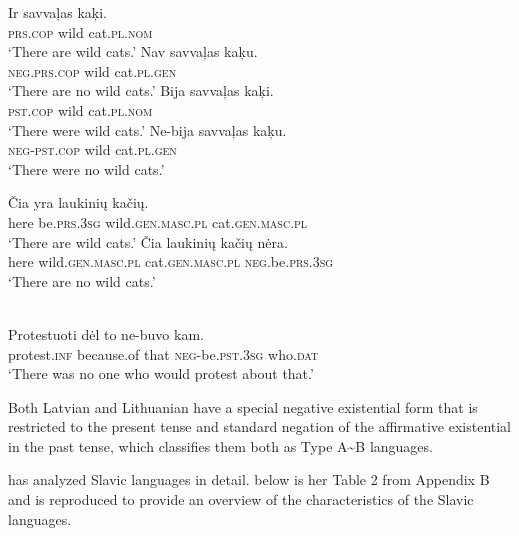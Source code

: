 ﻿\documentclass[output=paper]{langsci/langscibook}
\begin{document}
\begin{exe}\ex
{}
\begin{xlist}
\ex
\gll Ir savvaļas  kaķi. \\
\textsc{prs.cop} wild cat.\textsc{pl.nom} \\
    \glt `There are wild cats.'
\ex\label{ex:ieur-latvian-nowildcatsnow}
\gll Nav savvaļas kaķu.\\
\textsc{neg.prs.cop} wild cat.\textsc{pl.gen}\\
    \glt `There are no wild cats.'
\ex
\gll Bija      savvaļas kaķi.\\
\textsc{pst.cop} wild cat.\textsc{pl.nom}\\
    \glt `There were wild cats.'
\ex\label{ex:ieur-latvian-nowildcatspast}
\gll   Ne-bija savvaļas kaķu.\\
\textsc{neg}-\textsc{pst}.\textsc{cop} wild cat.\textsc{pl}.\textsc{gen}\\
    \glt `There were no wild cats.'
\end{xlist}
\ex{}
\begin{xlist}
\ex\gll Čia yra laukinių kačių. \\
here be.\textsc{prs.3sg} wild.\textsc{gen.masc.pl} cat.\textsc{gen.masc.pl}
\\
    \glt `There are wild cats.'
\ex\label{ex:ieur-lithuanian-nowildcatsnow}
\gll Čia  laukinių kačių nėra.\\
here wild.\textsc{gen.masc.pl} cat.\textsc{gen.masc.pl}
\textsc{neg}.be.\textsc{prs.3sg}\\
    \glt `There are no wild cats.'
\end{xlist}
\ex\label{ex:ieur-lithuanian-noprotest}
\\
    \gll Protestuoti dėl to ne-buvo kam.  \\
protest.\textsc{inf} because.of that
\textsc{neg}-be.\textsc{pst.3sg} who.\textsc{dat}\\
    \glt `There was no one who would protest about that.' 
\end{exe}
%
Both Latvian and Lithuanian have a special negative existential form that is restricted to the present tense and standard negation of the affirmative existential in the past tense, which classifies them both as Type A{\textasciitilde}B languages. 

\citet{Veselinova2014} has analyzed Slavic languages in detail.
 below is her Table 2 from Appendix B and is reproduced to
provide an overview of the characteristics of the Slavic languages.
\end{document}
